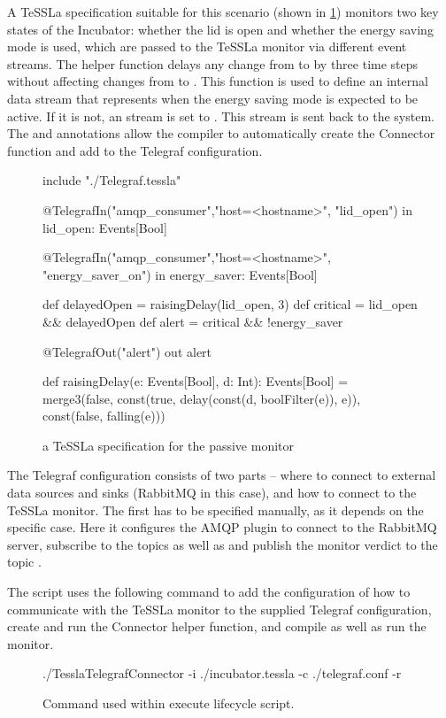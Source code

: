 A TeSSLa specification suitable for this scenario (shown in \cref{fig:tessla_spec_passive}) monitors two key states of the Incubator: whether the lid is open and whether the energy saving mode is used, which are passed to the TeSSLa monitor via different event streams.
The helper function  delays any change from  to  by three time steps without affecting changes from  to .
This function is used to define an internal data stream  that represents when the energy saving mode is expected to be active.
If it is not, an  stream is set to .
This stream is sent back to the system.
The  and  annotations allow the compiler to automatically create the Connector function and add to the Telegraf configuration.
%
\begin{figure}[ht]
	\begin{textcode}
		include "./Telegraf.tessla"

		@TelegrafIn("amqp_consumer","host=<hostname>", "lid_open")
		in lid_open: Events[Bool]

		@TelegrafIn("amqp_consumer","host=<hostname>", "energy_saver_on")
		in energy_saver: Events[Bool]

		def delayedOpen = raisingDelay(lid_open, 3)
		def critical = lid_open && delayedOpen
		def alert = critical && !energy_saver

		@TelegrafOut("alert")
		out alert

		def raisingDelay(e: Events[Bool], d: Int):
		Events[Bool] = merge3(false, const(true, delay(const(d, boolFilter(e)), e)), const(false, falling(e)))
	\end{textcode}
	\caption{a TeSSLa specification for the passive monitor}
	\label{fig:tessla_spec_passive}
\end{figure}%
%
The Telegraf configuration consists of two parts -- where to connect to external data sources and sinks (RabbitMQ in this case), and how to connect to the TeSSLa monitor.
The first has to be specified manually, as it depends on the specific case.
Here it configures the AMQP plugin to connect to the RabbitMQ server, subscribe to the topics  as well as  and publish the monitor verdict to the topic .

The  script uses the following command to add the configuration of how to communicate with the TeSSLa monitor to the supplied Telegraf configuration, create and run the Connector helper function, and compile as well as run the monitor.%
%
\begin{figure}[ht]
	\begin{textcode}
		./TesslaTelegrafConnector -i ./incubator.tessla -c ./telegraf.conf -r
	\end{textcode}
	\caption{Command used within execute lifecycle script.}
\end{figure}%

